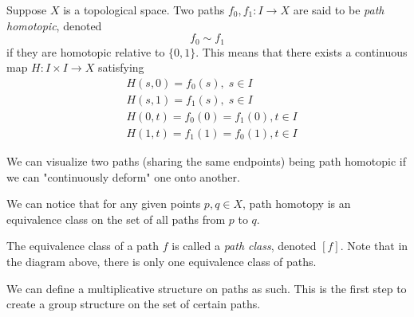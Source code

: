   \begin{definition}
  Suppose $X$ is a topological space. Two paths $f_0, f_1: I \longrightarrow X$ are said to be \textit{path homotopic}, denoted
  \[f_0 \sim f_1\]
  if they are homotopic relative to $\{0, 1\}$. This means that there exists a continuous map $H: I \times I \longrightarrow X$ satisfying
  \begin{align*}
      &H(s, 0) = f_0 (s), \; s \in I \\
      &H(s, 1) = f_1 (s), \; s \in I \\
      &H(0, t) = f_0 (0) = f_1 (0), t \in I \\
      &H(1, t) = f_1 (1) = f_0 (1) , t \in I
  \end{align*}
  \end{definition}
  We can visualize two paths (sharing the same endpoints) being path homotopic if we can "continuously deform" one onto another. 
  \begin{center}
  \end{center}
  We can notice that for any given points $p, q \in X$, path homotopy is an equivalence class on the set of all paths from $p$ to $q$. 

  \begin{definition}
  The equivalence class of a path $f$ is called a \textit{path class}, denoted $[f]$. Note that in the diagram above, there is only one equivalence class of paths. 
  \end{definition}

  We can define a multiplicative structure on paths as such. This is the first step to create a group structure on the set of certain paths. 


